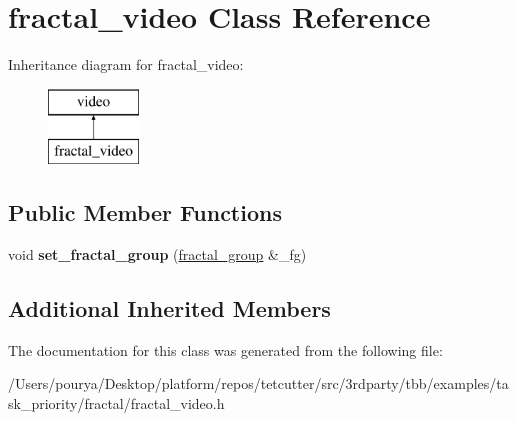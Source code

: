 \hypertarget{classfractal__video}{}\section{fractal\+\_\+video Class Reference}
\label{classfractal__video}
Inheritance diagram for fractal\+\_\+video\+:\begin{figure}[H]
\begin{center}
\leavevmode
\includegraphics[height=2.000000cm]{classfractal__video}
\end{center}
\end{figure}
\subsection*{Public Member Functions}
\begin{DoxyCompactItemize}
\item 
\hypertarget{classfractal__video_ab491d1004e7e056cfaf93723dd9f700a}{}void {\bfseries set\+\_\+fractal\+\_\+group} (\hyperlink{classfractal__group}{fractal\+\_\+group} \&\+\_\+fg)\label{classfractal__video_ab491d1004e7e056cfaf93723dd9f700a}

\end{DoxyCompactItemize}
\subsection*{Additional Inherited Members}


The documentation for this class was generated from the following file\+:\begin{DoxyCompactItemize}
\item 
/\+Users/pourya/\+Desktop/platform/repos/tetcutter/src/3rdparty/tbb/examples/task\+\_\+priority/fractal/fractal\+\_\+video.\+h\end{DoxyCompactItemize}
